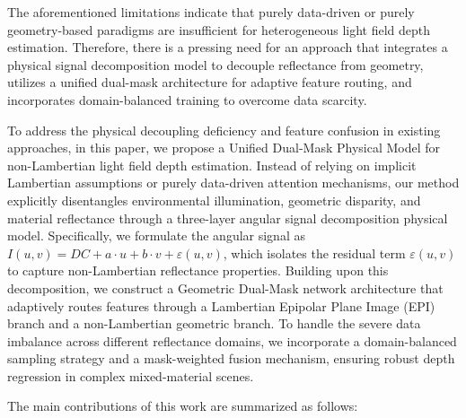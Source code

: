 The aforementioned limitations indicate that purely data-driven or purely geometry-based paradigms are insufficient for heterogeneous light field depth estimation. Therefore, there is a pressing need for an approach that integrates a physical signal decomposition model to decouple reflectance from geometry, utilizes a unified dual-mask architecture for adaptive feature routing, and incorporates domain-balanced training to overcome data scarcity.

To address the physical decoupling deficiency and feature confusion in existing approaches, in this paper, we propose a Unified Dual-Mask Physical Model for non-Lambertian light field depth estimation. Instead of relying on implicit Lambertian assumptions or purely data-driven attention mechanisms, our method explicitly disentangles environmental illumination, geometric disparity, and material reflectance through a three-layer angular signal decomposition physical model. Specifically, we formulate the angular signal as $I(u,v) = DC + a\cdot u + b\cdot v + \varepsilon(u,v)$, which isolates the residual term $\varepsilon(u,v)$ to capture non-Lambertian reflectance properties. Building upon this decomposition, we construct a Geometric Dual-Mask network architecture that adaptively routes features through a Lambertian Epipolar Plane Image (EPI) branch and a non-Lambertian geometric branch. To handle the severe data imbalance across different reflectance domains, we incorporate a domain-balanced sampling strategy and a mask-weighted fusion mechanism, ensuring robust depth regression in complex mixed-material scenes.

The main contributions of this work are summarized as follows:

